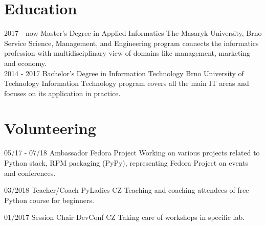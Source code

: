 \documentclass[]{friggeri-cv}
\begin{document}
\section{Education}
\begin{entrylist}
  \entry
    {2017 - now}
    {Master's Degree in Applied Informatics}
    {The Masaryk University, Brno}
    {Service Science, Management, and Engineering program connects the informatics profession with
    multidisciplinary view of domains like management, marketing and economy.\\}
  \entry
    {2014 - 2017}
    {Bachelor's Degree in Information Technology}
    {Brno University of Technology}
    {Information Technology program covers all the main IT areas and focuses on its application in practice.\\}
\end{entrylist}

\section{Volunteering}
\begin{entrylist}
    \entry
    {05/17 - 07/18}
    {Ambassador}
    {Fedora Project}
    {Working on various projects related to Python stack, RPM packaging (PyPy), representing Fedora
    Project on events and conferences.\\}

  \entry
    {03/2018}
    {Teacher/Coach}
    {PyLadies CZ}
    {Teaching and coaching attendees of free Python course for beginners.\\}

  \entry
    {01/2017}
    {Session Chair}
    {DevConf CZ}
    {Taking care of workshops in specific lab.\\}
\end{entrylist}

\end{document}
